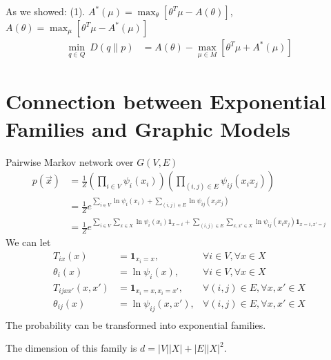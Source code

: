 \documentclass[11pt]{elegantbook}
\begin{document}
As we showed: (1). $A^*(\mu)=\max_\theta [\theta^T\mu- A(\theta)]$, $A(\theta)=\max_\mu [\theta^T\mu-A^*(\mu)]$
\begin{equation}
    \begin{aligned}
        \min_{q\in Q}\ D(q\| p)&=A(\theta)-\max_{\mu\in M}\left[\theta^T \mu +A^*(\mu)\right]
    \end{aligned}
    \nonumber
\end{equation}


\section{Connection between Exponential Families and Graphic Models}

Pairwise Markov network over $G(V,E)$
\begin{equation}
    \begin{aligned}
        p(\vec{x})&=\frac{1}{Z}\left(\prod_{i\in V}\psi_i(x_i)\right)\left(\prod_{(i,j)\in E}\psi_{ij}(x_ix_j)\right)\\
        &=\frac{1}{Z}e^{\sum_{i\in V}\ln \psi_i(x_i)+\sum_{(i,j)\in E}\ln \psi_{ij}(x_ix_j)}\\
        &=\frac{1}{Z}e^{\sum_{i\in V}\sum_{x\in X}\ln \psi_i(x_i) \mathbf{1}_{x=i}+\sum_{(i,j)\in E}\sum_{x,x'\in X}\ln \psi_{ij}(x_ix_j)\mathbf{1}_{x=i,x'=j}}
    \end{aligned}
    \nonumber
\end{equation}
We can let 
\begin{equation}
    \begin{aligned}
        T_{ix}(x)&=\mathbf{1}_{x_i=x},& \forall i\in V, \forall x\in X\\
        \theta_i(x)&=\ln\psi_i(x),&\forall i\in V, \forall x\in X\\
        T_{ijxx'}(x,x')&=\mathbf{1}_{x_i=x,x_i=x'},& \forall (i,j)\in E, \forall x,x'\in X\\
        \theta_{ij}(x)&=\ln\psi_{ij}(x,x'),&\forall (i,j)\in E, \forall x,x'\in X\\
    \end{aligned}
    \nonumber
\end{equation}
The probability can be transformed into exponential families.

The dimension of this family is $d = |V||X| + |E||X|^2$.
\end{document}
